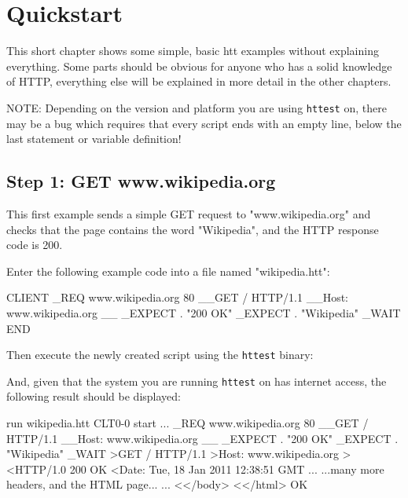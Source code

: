 \chapter{Quickstart}
\label{chap:quickstart}

This short chapter shows some simple, basic htt examples without explaining 
everything. Some parts should be obvious for anyone who has a solid knowledge 
of HTTP, everything else will be explained in more detail in the other chapters.

NOTE: Depending on the version and platform you are using \texttt{httest} on, there may be 
a bug which requires that every script ends with an empty line, below the last
statement or variable definition!

\section{Step 1: GET www.wikipedia.org} 

This first example sends a simple GET request to "www.wikipedia.org" and checks 
that the page contains the word "Wikipedia", and the HTTP response code is 200.

Enter the following example code into a file named "wikipedia.htt":

\begin{usplisting}
    CLIENT
    _REQ www.wikipedia.org 80
    __GET / HTTP/1.1
    __Host: www.wikipedia.org
    __
    _EXPECT . "200 OK"
    _EXPECT . "Wikipedia"
    _WAIT
    END
\end{usplisting}

Then execute the newly created script using the \texttt{httest} binary:

\begin{usplisting}
\end{usplisting}

\newpage 
And, given that the system you are running \texttt{httest} on has internet 
access, the following result should be displayed:

\begin{usplisting}
    run wikipedia.htt
    CLT0-0 start ...
    _REQ www.wikipedia.org 80
    __GET / HTTP/1.1
    __Host: www.wikipedia.org
    __
    _EXPECT . "200 OK"
    _EXPECT . "Wikipedia"
    _WAIT
    >GET / HTTP/1.1
    >Host: www.wikipedia.org
    >
    <HTTP/1.0 200 OK
    <Date: Tue, 18 Jan 2011 12:38:51 GMT
    ...
    ...many more headers, and the HTML page...
    ...
    <</body>
    <</html> OK
\end{usplisting}


